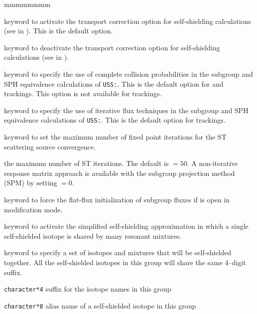\begin{ListeDeDescription}{mmmmmmmm}
\item[\moc{TRAN}] keyword to activate the transport correction option for
self-shielding calculations (see  in ). This
is the default option.

\item[\moc{NOTR}] keyword to deactivate the transport correction option for
self-shielding calculations (see  in ).

\item[\moc{PIJ}] keyword to specify the use of complete collision
probabilities in the subgroup and SPH equivalence calculations of {\tt USS:}.
This is the default option for  and  trackings.
This option is not available for  trackings.

\item[\moc{ARM}] keyword to specify the use of iterative flux techniques
in the subgroup and SPH equivalence calculations of {\tt USS:}.
This is the default option for  trackings.

\item[\moc{MAXST}] keyword to set the maximum number of fixed point iterations
for the ST scattering source convergence.

\item[\dusa{imax}] the maximum number of ST iterations. The default is
 $=50$. A non-iterative response matrix approach is available with
the subgroup projection method (SPM) by setting  $=0$.

\item[\moc{FLAT}] keyword to force the flat-flux initialization of subgroup fluxes if 
is open in modification mode.

\item[\moc{CALC}] keyword to activate the simplified self-shielding
approximation in which a single self-shielded isotope is shared by many
resonant mixtures.

\item[\moc{REGI}] keyword to specify a set of isotopes and mixtures that
will be self-shielded together. All the self-shielded isotopes in this group
will share the same 4--digit suffix.

\item[\dusa{suffix}] {\tt character*4} suffix for the isotope names in this
group

\item[\dusa{isot}] {\tt character*8} alias name of a self-shielded isotope in this
group


\end{ListeDeDescription}
